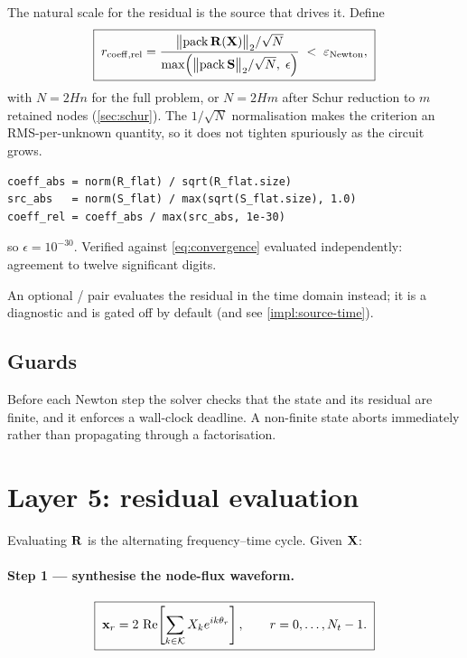 The natural scale for the residual is the source that drives it. Define
\begin{equation}
  \boxed{\;
  r_{\mathrm{coeff,rel}}
  =
  \frac{\bigl\|\mathrm{pack}\,\mathbf{R}(\mathbf{X})\bigr\|_2/\sqrt{N}}
       {\max\!\left(\bigl\|\mathrm{pack}\,\mathbf{S}\bigr\|_2/\sqrt{N},\;\epsilon\right)}
  \;<\;
  \varepsilon_{\mathrm{Newton}},
  \;}
  \label{eq:convergence}
\end{equation}
with $N = 2Hn$ for the full problem, or $N = 2Hm$ after Schur reduction to $m$
retained nodes (\cref{sec:schur}). The $1/\sqrt{N}$ normalisation makes the
criterion an RMS-per-unknown quantity, so it does not tighten spuriously as the
circuit grows.

\begin{implnote}
\begin{lstlisting}
coeff_abs = norm(R_flat) / sqrt(R_flat.size)
src_abs   = norm(S_flat) / max(sqrt(S_flat.size), 1.0)
coeff_rel = coeff_abs / max(src_abs, 1e-30)
\end{lstlisting}
so $\epsilon = 10^{-30}$. Verified against \eqref{eq:convergence} evaluated
independently: agreement to twelve significant digits.

An optional / pair evaluates the residual in the
time domain instead; it is a diagnostic and is gated off by default (and see
\cref{impl:source-time}).
\end{implnote}

\subsection{Guards}

Before each Newton step the solver checks that the state and its residual are
finite, and it enforces a wall-clock deadline. A non-finite state aborts
immediately rather than propagating  through a factorisation.

\section{Layer 5: residual evaluation}
\label{sec:residual-eval}

Evaluating $\mathbf{R}$ is the alternating frequency--time cycle. Given $\mathbf{X}$:

\paragraph{Step 1 --- synthesise the node-flux waveform.}
\begin{equation}
  \boxed{\;
  \mathbf{x}_r = 2\,\operatorname{Re}\!\left[\sum_{k\in\mathcal{K}} X_k e^{ik\theta_r}\right],
  \qquad r=0,\dots,N_t-1 .
  \;}
  \label{eq:aft-1}
\end{equation}

